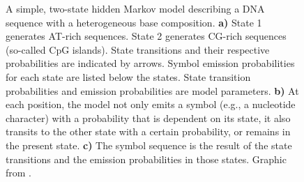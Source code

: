 \begin{figure}[t]
	\centering
	\def\svgwidth{\textwidth}
	
	\caption[A simple hidden Markov model]{A simple, two-state hidden Markov model
		describing a DNA sequence with a heterogeneous base composition. 
		\textbf{a)} State 1 generates AT-rich sequences. State 2 generates CG-rich
			sequences (so-called CpG islands). State transitions and their respective
			probabilities are indicated by arrows. Symbol emission probabilities for
			each state are listed below the states. State transition probabilities
			and emission probabilities are model parameters.
		\textbf{b)} At each position, the model not only emits a symbol (e.g., a
			nucleotide character) with a probability that is dependent on its state, it
			also transits to the other state with a certain probability, or remains in
			the present state.
		\textbf{c)} The symbol sequence is the result of the state transitions and
			the emission probabilities in those states. 
		Graphic from \citet{eddy1996}.
	}
	\label{fig:hmm}
\end{figure}

